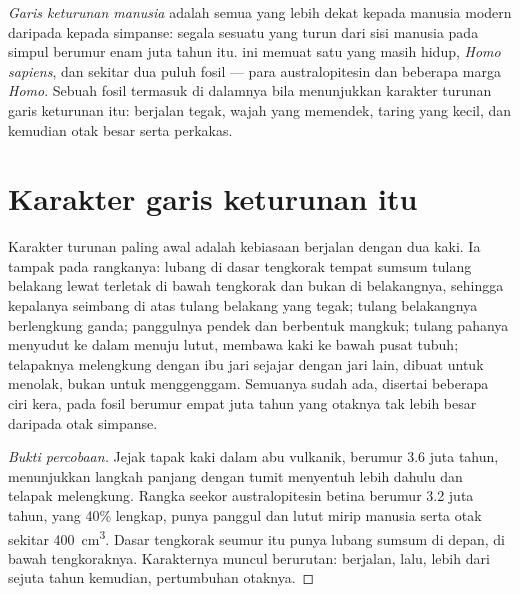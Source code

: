 \begin{definition}\label{def:g12:human-evolution:lineage}
\emph{Garis keturunan manusia} adalah
 semua  yang lebih dekat kepada manusia modern daripada
kepada simpanse: segala sesuatu yang turun dari sisi manusia pada
simpul berumur enam juta tahun itu.  ini memuat satu  yang
masih hidup, \emph{Homo sapiens}, dan sekitar dua puluh  fosil
--- para australopitesin dan beberapa  marga \emph{Homo}.
Sebuah fosil termasuk di dalamnya bila menunjukkan karakter turunan
garis keturunan itu: berjalan tegak, wajah yang memendek, taring yang
kecil, dan kemudian otak besar serta perkakas.
\end{definition}

\section{Karakter garis keturunan itu}

\begin{proposition}\label{prop:g12:human-evolution:bipedalism}
Karakter turunan paling awal  adalah kebiasaan
berjalan dengan dua kaki. Ia tampak pada rangkanya: lubang di dasar
tengkorak tempat sumsum tulang belakang lewat terletak di bawah
tengkorak dan bukan di belakangnya, sehingga kepalanya seimbang di
atas tulang belakang yang tegak; tulang belakangnya berlengkung ganda;
panggulnya pendek dan berbentuk mangkuk; tulang pahanya menyudut ke
dalam menuju lutut, membawa kaki ke bawah pusat tubuh; telapaknya
melengkung dengan ibu jari sejajar dengan jari lain, dibuat untuk
menolak, bukan untuk menggenggam. Semuanya sudah ada, disertai
beberapa ciri kera, pada fosil berumur empat juta tahun yang otaknya
tak lebih besar daripada otak simpanse.
\end{proposition}
\begin{proof}[Bukti percobaan]
Jejak tapak kaki dalam abu vulkanik, berumur 3.6 juta tahun,
menunjukkan langkah panjang dengan tumit menyentuh lebih dahulu dan
telapak melengkung. Rangka seekor australopitesin betina berumur 3.2
juta tahun, yang 40\% lengkap, punya panggul dan lutut mirip manusia
serta otak sekitar \qty{400}{cm^3}. Dasar tengkorak seumur itu punya
lubang sumsum di depan, di bawah tengkoraknya. Karakternya muncul
berurutan: berjalan, lalu, lebih dari sejuta tahun kemudian,
pertumbuhan otaknya.
\end{proof}

